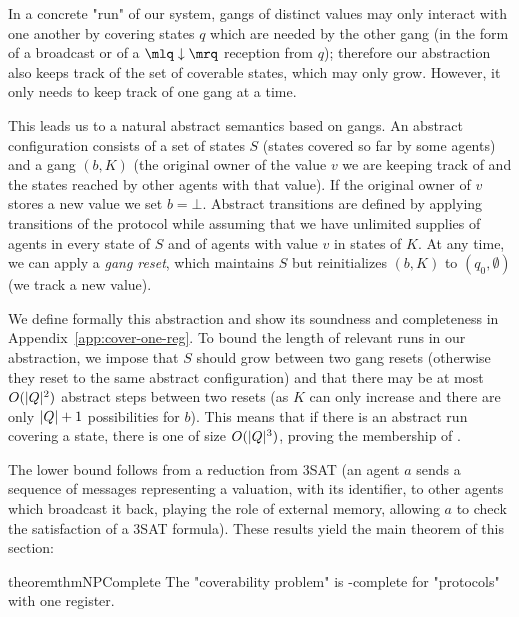 %

In a concrete "run" of our system, gangs of distinct values may only interact with one another by covering states $q$ which are needed by the other gang (in the form of a broadcast or of a $\quotemarks{\enregact}$ reception from $q$); therefore our abstraction also keeps track of the set of coverable states, which may only grow. However, it only needs to keep track of one gang at a time.

This leads us to a natural abstract semantics based on gangs. An abstract configuration consists of a set of states $S$ (states covered so far by some agents) and a gang $(b, K)$ (the original owner of the value $v$ we are keeping track of and the states reached by other agents with that value). If the original owner of $v$ stores a new value we set $b = \bot$.
Abstract transitions are defined by applying transitions of the protocol while assuming that we have unlimited supplies of agents in every state of $S$ and of agents with value $v$ in states of $K$.
At any time, we can apply a \emph{gang reset}, which maintains $S$ but reinitializes $(b,K)$ to $(q_0, \emptyset)$ (we track a new value). 

We define formally this abstraction and show its soundness and completeness in Appendix~\ref{app:cover-one-reg}.
To bound the length of relevant runs in our abstraction, we impose that $S$ should grow between two gang resets (otherwise they reset to the same abstract configuration) and that there may be at most $O(|Q|^2)$ abstract steps between two resets (as $K$ can only increase and there are only $|Q|+1$ possibilities for $b$). This means that if there is an abstract run covering a state, there is one of size $O(|Q|^3)$, proving the \NP membership of \COVER. 

The \NP lower bound follows from a reduction from 3SAT (an agent $a$ sends a sequence of messages representing a valuation, with its identifier, to other agents which broadcast it back, playing the role of external memory, allowing $a$ to check the satisfaction of a 3SAT formula).
These results yield the main theorem of this section:


\begin{restatable}{theorem}{thmNPComplete}
	\label{thm:np-complete-query-cover}
	The "coverability problem" is \NP-complete for "protocols" with one register.
\end{restatable}

